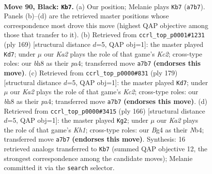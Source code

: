 \documentclass[11pt]{article}
\begin{document}
\clearpage

\begin{figure}[p]\centering
\begin{subfigure}{0.46\textwidth}\centering
\resizebox{\linewidth}{!}{%
\newchessgame
\chessboard[
  setfen={7B/k7/8/8/p1p3b1/8/5K2/1N6 b - - 35 90},
  showmover=false,
  pgfstyle=straightmove, color=movearrow, markmove={a7-b7}
]}
\caption{}
\end{subfigure}\hfill
\begin{subfigure}{0.46\textwidth}\centering
\resizebox{\linewidth}{!}{%
\newchessgame
\chessboard[
  setfen={8/2k5/8/p7/P7/3N4/K3p3/8 b - - 15 85},
  showmover=false,
  pgfstyle=straightmove, color=movearrow, markmove={c7-d7}
]}
\caption{}
\end{subfigure}
\\[4pt]
\begin{subfigure}{0.46\textwidth}\centering
\resizebox{\linewidth}{!}{%
\newchessgame
\chessboard[
  setfen={8/2k5/8/p2K4/P7/3N4/4p3/8 b - - 47 90},
  showmover=false,
  pgfstyle=straightmove, color=movearrow, markmove={c7-d7}
]}
\caption{}
\end{subfigure}\hfill
\begin{subfigure}{0.46\textwidth}\centering
\resizebox{\linewidth}{!}{%
\newchessgame
\chessboard[
  setfen={8/4n3/4P3/6P1/1N6/8/4k3/7K w - - 5 84},
  showmover=false,
  pgfstyle=straightmove, color=movearrow, markmove={h1-g2}
]}
\caption{}
\end{subfigure}
\caption{\textbf{Move 90, Black: \texttt{Kb7}.} (a) Our position; Melanie plays \texttt{Kb7} (\texttt{a7b7}). Panels (b)--(d) are the retrieved master positions whose correspondence most drove this move (highest QAP objective among those that transfer to it). (b) Retrieved from \texttt{ccrl\_top\_p0001\#1231} (ply 169) [structural distance $d$=5, QAP obj=1]: the master played \texttt{Kd7}; under $\mu$ our \emph{Ka2} plays the role of that game's \emph{Kc2}; cross-type roles: our \emph{b}h8 as their \emph{p}a4; transferred move \texttt{a7b7} \textbf{(endorses this move)}. (c) Retrieved from \texttt{ccrl\_top\_p0000\#831} (ply 179) [structural distance $d$=5, QAP obj=1]: the master played \texttt{Kd7}; under $\mu$ our \emph{Ka2} plays the role of that game's \emph{Kc2}; cross-type roles: our \emph{b}h8 as their \emph{p}a4; transferred move \texttt{a7b7} \textbf{(endorses this move)}. (d) Retrieved from \texttt{ccrl\_top\_p0000\#3415} (ply 166) [structural distance $d$=5, QAP obj=1]: the master played \texttt{Kg2}; under $\mu$ our \emph{Ka2} plays the role of that game's \emph{Kh1}; cross-type roles: our \emph{B}g4 as their \emph{N}b4; transferred move \texttt{a7b7} \textbf{(endorses this move)}. Synthesis: 16 retrieved analogs transferred to \texttt{Kb7} (summed QAP objective 12, the strongest correspondence among the candidate moves); Melanie committed it via the \texttt{search} selector.}
\label{fig:thought-m179}
\end{figure}
\end{document}
